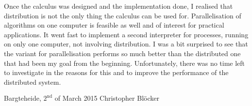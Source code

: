 Once the calculus was designed and the implementation done, I realised that distribution is not the only thing the calculus can be used for. Parallelisation of algorithms on one computer is feasible as well and of interest for practical applications. It went fast to implement a second interpreter for processes, running on only one computer, not involving distribution. I was a bit surprised to see that the variant for parallelisation performs so much better than the distributed one that had been my goal from the beginning. Unfortunately, there was no time left to investigate in the reasons for this and to improve the performance of the distributed system.

\vfill

\noindent
Bargteheide, $2^\text{nd}$ of March 2015 \hfill Christopher Blöcker